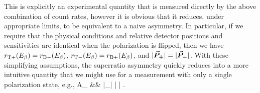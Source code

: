 This is explicitly an experimental quantity that is measured directly by the above combination of count rates, however it is obvious that it reduces, under appropriate limits, to be equivalent to a naive asymmetry.  In particular, if we require that the physical conditions and relative detector positions and sensitivities are identical when the polarization is flipped, then we have $r_{\mathrm T+}(E_{\beta}) = r_{\mathrm B-}(E_{\beta})$, $r_{\mathrm T-}(E_{\beta}) = r_{\mathrm B+}(E_{\beta})$, and $|\bm{\vec{P}}_{\bm{+}}| = |\bm{\vec{P}}_{\bm{-}}|$.
%
With these simplifying assumptions, the superratio asymmetry quickly reduces into a more intuitive quantity that we might use for a measurement with only a single polarization state, e.g.,  
\bea
A_{} &\rightarrow&  
\;\;\; \xrightarrow[\bFierz = 0]{} \;\;\; \Abeta {} |\vecP_{\bm{+}}| \: \langle | \cos\theta | \rangle . 
\label{eq:singlepol_asymmetry}
\eea

